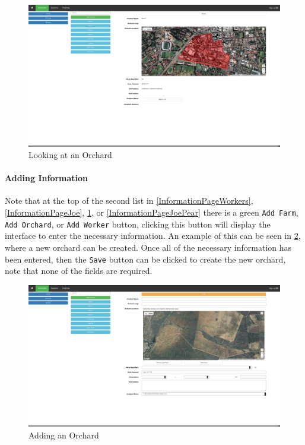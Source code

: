 \documentclass[11pt]{article}
\begin{document}
\begin{figure}
 \centering
 \includegraphics[width=12cm, keepaspectratio]{Images/webViewOrchard.png}
 \caption{Looking at an Orchard}
 \label{InformationPagePear}
\end{figure}

\paragraph{Adding Information}Note that at the top of the second list in \ref{InformationPageWorkers}, \ref{InformationPageJoe}, \ref{InformationPagePear}, or \ref{InformationPageJoePear} there is a green \texttt{Add Farm}, \texttt{Add Orchard}, or \texttt{Add Worker} button, clicking this button will display the interface to enter the necessary information. An example of this can be seen in \ref{InformationAddOrchard}, where a new orchard can be created. Once all of the necessary information has been entered, then the \texttt{Save} button can be clicked to create the new orchard, note that none of the fields are required.

\begin{figure}
 \centering
 \includegraphics[width=12cm, keepaspectratio]{Images/webInformation-AddOrchard.png}
 \caption{Adding an Orchard}
 \label{InformationAddOrchard}
\end{figure}
\end{document}

